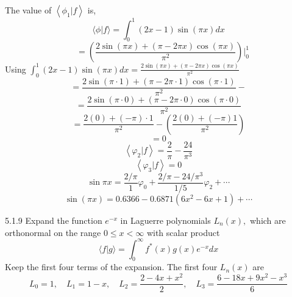 The value of $\left\langle\phi_{1} | f\right\rangle$ is,
$$\langle\phi | f\rangle=\int_{0}^{1}(2 x-1) \sin (\pi x) d x$$
$$\quad=\left(\frac{2 \sin (\pi x)+(\pi-2 \pi x) \cos (\pi x)}{\pi^{2}}\right)\Bigg|_{0}^{1}$$
Using $\int_{0}^{1}(2 x-1) \sin (\pi x) d x=\frac{2 \sin (\pi x)+(\pi-2 \pi x) \cos (\pi x)}{\pi^{2}}$
$$=\frac{2 \sin (\pi \cdot 1)+(\pi-2 \pi \cdot 1) \cos (\pi \cdot 1)}{\pi^{2}}-$$
$$=\frac{2 \sin (\pi \cdot 0)+(\pi-2 \pi \cdot 0) \cos (\pi \cdot 0)}{\pi^{2}}$$
$$=\frac{2(0)+(-\pi) \cdot 1}{\pi^{2}}-\left(\frac{2(0)+(-\pi) 1}{\pi^{2}}\right)$$
$$=0$$
$$
\left\langle\varphi_{2} | f\right\rangle=\frac{2}{\pi}-\frac{24}{\pi^{3}}
$$
$$
\left\langle\varphi_{3} | f\right\rangle=0
$$
$$
\sin \pi x=\frac{2 / \pi}{1} \varphi_{0}+\frac{2 / \pi-24 / \pi^{3}}{1 / 5} \varphi_{2}+\cdots
$$
$$\sin(\pi x) =0.6366-0.6871\left(6 x^{2}-6 x+1\right)+\cdots $$

\newpage

\begin{mybox}{5.1.9}
Expand the function $e^{-x}$ in Laguerre polynomials $L_{n}(x),$ which are orthonormal on the range $0 \leq x<\infty$ with scalar product
$$
\langle f | g\rangle=\int_{0}^{\infty} f^{*}(x) g(x) e^{-x} d x
$$
Keep the first four terms of the expansion. The first four $L_{n}(x)$ are
$$
L_{0}=1, \quad L_{1}=1-x, \quad L_{2}=\frac{2-4 x+x^{2}}{2}, \quad L_{3}=\frac{6-18 x+9 x^{2}-x^{3}}{6}
$$
\end{mybox}


